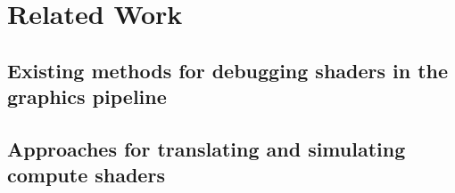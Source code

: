 
\chapter{Related Work}\label{cha:RelatedWork}
\section{Existing methods for debugging shaders in the graphics pipeline}

\section{Approaches for translating and simulating compute shaders}